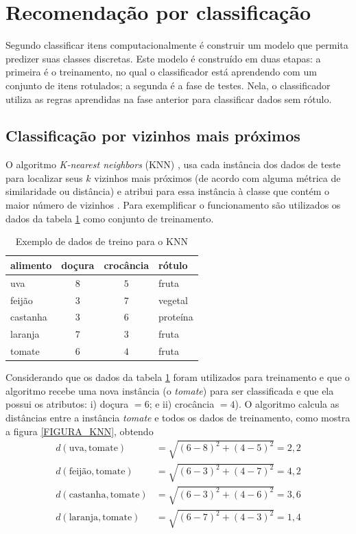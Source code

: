 \section{Recomendação por classificação}\label{SEC_RECOMENDACAO_CLASSIFICACAO}
Segundo  classificar itens computacionalmente é construir um modelo que permita predizer suas classes discretas. Este modelo é construído em duas etapas: a primeira é o treinamento, no qual o classificador está aprendendo com um conjunto de itens rotulados; a segunda é a fase de testes. Nela, o classificador utiliza as regras aprendidas na fase anterior para classificar dados sem rótulo.

\subsection{Classificação por vizinhos mais próximos}
O algoritmo \emph{K-nearest neighbors} (KNN) \cite{HanKamber2011}, usa cada instância dos dados de teste para localizar seus \emph{\(k\)} vizinhos mais próximos (de acordo com alguma métrica de similaridade ou distância) e atribui para essa instância à classe que contém o maior número de vizinhos \cite{HanKamber2011}. Para exemplificar o funcionamento são utilizados os dados da tabela \ref{TAB_DADOS_EXEMPLO_KNN} como conjunto de treinamento.  
\begin{table}[hbt]
\center
\caption{Exemplo de dados de treino para o KNN}
\label{TAB_DADOS_EXEMPLO_KNN}	
	\begin{tabular}{|l|c|c|l|}
	\hline
		\textbf{alimento} & \textbf{doçura} & \textbf{crocância}  & \textbf{rótulo}   \\ \hline		
			uva 		& \(8\) & \(5\) & fruta  		\\ \hline
			feijão  	& \(3\) & \(7\) & vegetal 		\\ \hline
			castanha	& \(3\) & \(6\) & proteína  	\\ \hline
			laranja 	& \(7\) & \(3\) & fruta  		\\ \hline	
			tomate 		& \(6\) & \(4\) & fruta  		\\ \hline	
	\end{tabular}
	\vspace{0.1cm}
\end{table}

Considerando que os dados da tabela \ref{TAB_DADOS_EXEMPLO_KNN} foram utilizados para treinamento e que o algoritmo recebe uma nova instância (o \emph{tomate}) para ser classificada e que ela possui os atributos: i) doçura \( = 6\); e ii) crocância \( = 4\)). O algoritmo calcula as distâncias entre a instância \emph{tomate} e todos os dados de treinamento, como mostra a figura \ref{FIGURA_KNN}, obtendo
\begin{align}
d(\mbox{uva},\mbox{tomate}) &= \sqrt{(6-8)^{2}+(4-5)^{2}} = 2,2		\\
d(\mbox{feijão},\mbox{tomate}) &= \sqrt{(6-3)^{2}+(4-7)^{2}} = 4,2	\\
d(\mbox{castanha},\mbox{tomate}) &= \sqrt{(6-3)^{2}+(4-6)^{2}} = 3,6	\\
d(\mbox{laranja},\mbox{tomate}) &= \sqrt{(6-7)^{2}+(4-3)^{2}} = 1,4									
\end{align}

